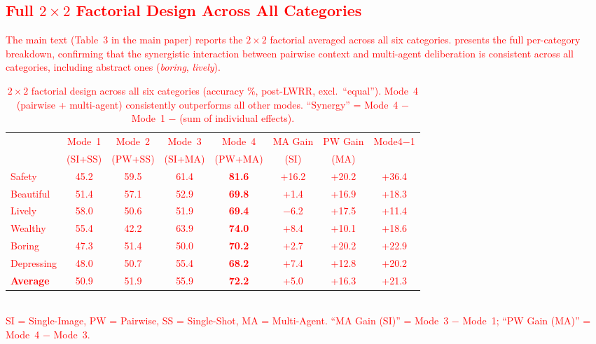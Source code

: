 \documentclass[runningheads]{llncs}
\begin{document}
\FloatBarrier
\textcolor{red}{
\subsection{Full $2{\times}2$ Factorial Design Across All Categories}
\label{sec:factorial_all}

The main text (Table~3 in the main paper) reports the $2{\times}2$ factorial averaged across all six categories.
 presents the full per-category breakdown, confirming that the synergistic interaction between pairwise context and multi-agent deliberation is consistent across all categories, including abstract ones (\emph{boring}, \emph{lively}).

\begin{table}[H]
\centering
\caption{$2{\times}2$ factorial design across all six categories (accuracy \%, post-LWRR, excl.\ ``equal''). Mode~4 (pairwise + multi-agent) consistently outperforms all other modes. ``Synergy'' = Mode~4 $-$ Mode~1 $-$ (sum of individual effects).}
\label{tab:factorial_all}
\small
\setlength{\tabcolsep}{3pt}
\begin{tabular}{l|cccc|ccc}
\toprule
 & Mode~1 & Mode~2 & Mode~3 & Mode~4 & MA Gain & PW Gain & Mode4$-$1 \\
 & (SI+SS) & (PW+SS) & (SI+MA) & (PW+MA) & (SI) & (MA) & \\
\midrule
Safety      & 45.2 & 59.5 & 61.4 & \textbf{81.6} & +16.2 & +20.2 & +36.4 \\
Beautiful   & 51.4 & 57.1 & 52.9 & \textbf{69.8} & +1.4  & +16.9 & +18.3 \\
Lively      & 58.0 & 50.6 & 51.9 & \textbf{69.4} & $-$6.2  & +17.5 & +11.4 \\
Wealthy     & 55.4 & 42.2 & 63.9 & \textbf{74.0} & +8.4  & +10.1 & +18.6 \\
Boring      & 47.3 & 51.4 & 50.0 & \textbf{70.2} & +2.7  & +20.2 & +22.9 \\
Depressing  & 48.0 & 50.7 & 55.4 & \textbf{68.2} & +7.4  & +12.8 & +20.2 \\
\midrule
\textbf{Average} & 50.9 & 51.9 & 55.9 & \textbf{72.2} & +5.0  & +16.3 & +21.3 \\
\bottomrule
\end{tabular}
\\[4pt]
\footnotesize{SI = Single-Image, PW = Pairwise, SS = Single-Shot, MA = Multi-Agent. ``MA Gain (SI)'' = Mode~3 $-$ Mode~1; ``PW Gain (MA)'' = Mode~4 $-$ Mode~3.}
\end{table}

}
\end{document}
